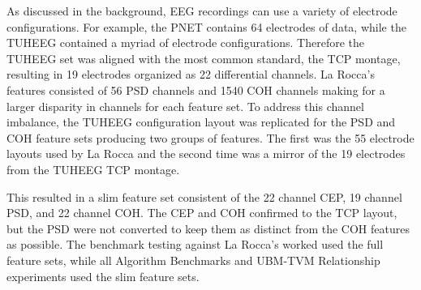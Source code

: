 \medskip
\noindent{}
\medskip

As discussed in the background, \ac{EEG} recordings can use a variety of electrode configurations. For example, the \ac{PNET} contains 64 electrodes of data, while the \ac{TUHEEG} contained a myriad of electrode configurations. Therefore the \ac{TUHEEG} set was aligned with the most common standard, the \ac{TCP} montage, resulting in 19 electrodes organized as 22 differential channels. La Rocca's features consisted of 56 \ac{PSD} channels and 1540 \ac{COH} channels making for a larger disparity in channels for each feature set. To address this channel imbalance, the \ac{TUHEEG} configuration layout was replicated for the \ac{PSD} and \ac{COH} feature sets producing two groups of features. The first was the 55 electrode layouts used by La Rocca \cite{Rocca2014} and the second time was a mirror of the 19 electrodes from the \ac{TUHEEG} \ac{TCP} montage.

This resulted in a slim feature set consistent of the 22 channel \ac{CEP}, 19 channel \ac{PSD}, and 22 channel \ac{COH}. The \ac{CEP} and \ac{COH} confirmed to the \ac{TCP} layout, but the \ac{PSD} were not converted to keep them as distinct from the \ac{COH} features as possible. The benchmark testing against La Rocca's worked used the full feature sets, while all Algorithm Benchmarks and \ac{UBM}-\ac{TVM} Relationship experiments used the slim feature sets.

